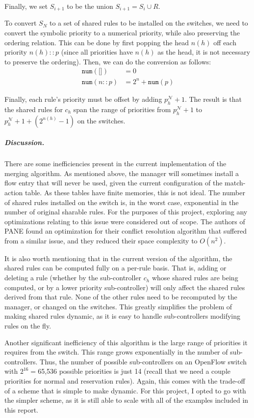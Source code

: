 \documentclass{article}
\begin{document}
Finally, we set $S_{i+1}$ to be the union $S_{i+1} = S_i \cup R$.

To convert $S_N$ to a set of shared rules to be installed on the switches,
we need to convert the symbolic priority to a numerical priority, 
while also preserving the ordering relation. 
This can be done by first popping the head $n(h)$ off each priority $n(h)::p$
(since all priorities have $n(h)$ as the head, it is not necessary to preserve
the ordering). 
Then, we can do the conversion as follows:
\begin{align*}
  \texttt{num}(\texttt{[]}) &= 0 \\
  \texttt{num}(n :: p) &= 2^n + \texttt{num}(p)
\end{align*}

Finally, each rule's priority must be offset by adding $p_h^{\mathcal{N}} + 1$.
The result is that the shared rules for $c_h$ span the range of priorities 
from $p_h^{\mathcal{N}} + 1$ to $p_h^{\mathcal{N}} + 1 + (2^{n(h)} - 1)$ on the switches.


\subparagraph{Discussion.}

There are some inefficiencies present in the current implementation of 
the merging algorithm. As mentioned above, the manager will
sometimes install a flow entry that will never be used, given the
current configuration of the match-action table.
As these tables have finite memories, this is not ideal.
The number of shared rules installed on the switch is, in the worst case,
exponential in the number of original sharable rules.
For the purposes of this project, exploring any optimizations relating
to this issue were considered out of scope.
The authors of PANE \cite{participatory_networking} found an optimization for
their conflict resolution algorithm that suffered from a similar issue,
and they reduced their space complexity to $O(n^2)$.

It is also worth mentioning that in the current version of the algorithm,
the shared rules can be computed fully on a per-rule basis. That is,
adding or deleting a rule (whether by the sub-controller $c_h$ whose
shared rules are being computed, or by a lower priority sub-controller)
will only affect the shared rules derived from that rule. 
None of the other rules need to be recomputed by the manager,
or changed on the switches.
This greatly simplifies the problem of making shared rules dynamic, as 
it is easy to handle sub-controllers modifying rules on the fly.

Another significant inefficiency of this algorithm is the large
range of priorities it requires from the switch. This range
grows exponentially in the number of sub-controllers. 
Thus, the number of possible sub-controllers on an OpenFlow switch with
$2^{16}=$65,536 possible priorities is just 14 (recall that we need a couple priorities
for normal and reservation rules). 
Again, this comes with the trade-off of a scheme that is simple to make dynamic.
For this project, I opted to go with the simpler scheme, as it is still
able to scale with all of the examples included in this report.
\end{document}
